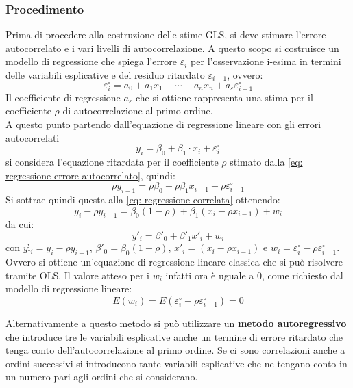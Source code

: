 \subsubsection{Procedimento}
Prima di procedere alla costruzione delle stime GLS,  si deve stimare l'errore autocorrelato e i vari livelli di autocorrelazione. A questo scopo si costruisce un modello di regressione che spiega l'errore $\varepsilon_i$ per l'osservazione i-esima in termini delle variabili esplicative e del residuo ritardato $\varepsilon_{i-1}$, ovvero:
\begin{equation}
\varepsilon_i^\circ = a_0 + a_1x_1 + \cdots + a_n x_n + a_\varepsilon \varepsilon_{i-1}^\circ
\label{eq: regressione-errore-autocorrelato}
\end{equation}
Il coefficiente di regressione $a_\varepsilon$ che si ottiene rappresenta una stima per il coefficiente $\rho$ di autocorrelazione al primo ordine.\\
A questo punto partendo dall'equazione di regressione lineare con gli errori autocorrelati
\begin{equation}
	y_i = \beta_0 + \beta_1 \cdot x_i + \varepsilon_i^\circ
	\label{eq: regressione-correlata}
\end{equation}
si considera l'equazione ritardata per il coefficiente $\rho$ stimato dalla \eqref{eq: regressione-errore-autocorrelato}, quindi:
\begin{equation}
	\rho y_{i-1} = \rho \beta_0 + \rho \beta_1 x_{i-1} + \rho \varepsilon_{i-1}^\circ
\end{equation}
Si sottrae quindi questa alla \eqref{eq: regressione-correlata} ottenendo:
\begin{equation}
	y_i - \rho y_{i-1} = \beta_0 (1-\rho) +  \beta_1 (x_i - \rho x_{i-1}) + w_i
\end{equation}
da cui:
\begin{equation}
	y'_i = \beta'_0 + \beta'_1 x'_i + w_i
\end{equation}
con $yì_i = y_i - \rho y_{i-1}$, $\beta'_0 = \beta_0 (1-\rho)$, $x'_i = (x_i - \rho x_{i-1})$ e $w_i = \varepsilon_i^\circ - \rho \varepsilon_{i-1}^\circ$. Ovvero si ottiene un'equazione di regressione lineare classica che si può risolvere tramite OLS. Il valore atteso per i $w_i$ infatti ora è uguale a $0$, come richiesto dal modello di regressione lineare:
\begin{equation}
	E(w_i) = E(\varepsilon_i^\circ - \rho \varepsilon_{i-1}^\circ) = 0
\end{equation}

Alternativamente a questo metodo si può utilizzare un \textbf{metodo autoregressivo} che introduce tre le variabili esplicative anche un termine di errore ritardato che tenga conto dell'autocorrelazione al primo ordine. Se ci sono correlazioni anche a ordini successivi si introducono tante variabili esplicative che ne tengano conto in un numero pari agli ordini che si considerano.
